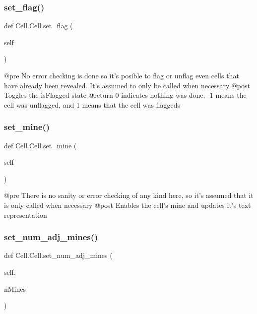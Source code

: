 \subsubsection{\texorpdfstring{set\+\_\+flag()}{set\_flag()}}
{\footnotesize\ttfamily def Cell.\+Cell.\+set\+\_\+flag (\begin{DoxyParamCaption}\item[{}]{self }\end{DoxyParamCaption})}

\begin{DoxyVerb}@pre    No error checking is done so it's posible to flag or unflag
even cells that have already been revealed. It's assumed to only be called
when necessary
    @post   Toggles the isFlagged state
    @return 0 indicates nothing was done, -1 means the cell was unflagged,
    and 1 means that the cell was flaggeds
\end{DoxyVerb}
 \mbox{\label{class_cell_1_1_cell_ac79f4595ce241a92297768dbc5aad4dc}} 
\subsubsection{\texorpdfstring{set\+\_\+mine()}{set\_mine()}}
{\footnotesize\ttfamily def Cell.\+Cell.\+set\+\_\+mine (\begin{DoxyParamCaption}\item[{}]{self }\end{DoxyParamCaption})}

\begin{DoxyVerb}@pre    There is no sanity or error checking of any kind here, so
it's assumed that it is only called when necessary
    @post   Enables the cell's mine and updates it's text representation
\end{DoxyVerb}
 \mbox{\label{class_cell_1_1_cell_acb977a068cd459ae068fcc35e1b4a879}} 
\subsubsection{\texorpdfstring{set\+\_\+num\+\_\+adj\+\_\+mines()}{set\_num\_adj\_mines()}}
{\footnotesize\ttfamily def Cell.\+Cell.\+set\+\_\+num\+\_\+adj\+\_\+mines (\begin{DoxyParamCaption}\item[{}]{self,  }\item[{}]{n\+Mines }\end{DoxyParamCaption})}

